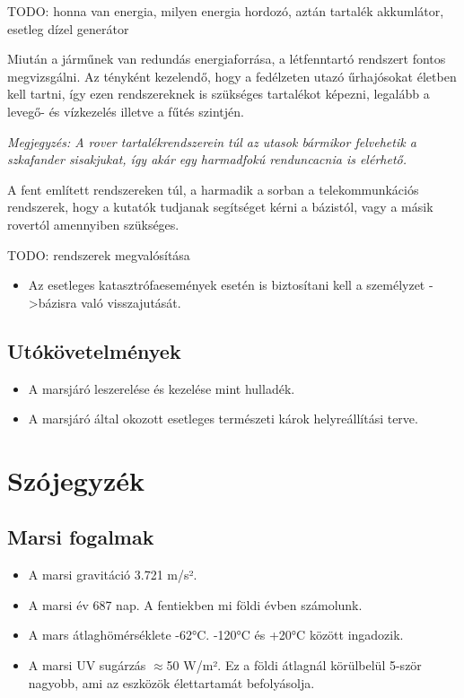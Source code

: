 \documentclass[12pt]{report}
\begin{document}
TODO: honna van energia, milyen energia hordozó, aztán tartalék akkumlátor, esetleg dízel generátor

Miután a járműnek van redundás energiaforrása, a létfenntartó rendszert fontos megvizsgálni. Az tényként kezelendő, hogy a fedélzeten utazó űrhajósokat életben kell tartni, így ezen rendszereknek is szükséges tartalékot képezni, legalább a levegő- és vízkezelés illetve a fűtés szintjén. 

\textit{Megjegyzés: A rover tartalékrendszerein túl az utasok bármikor felvehetik a szkafander sisakjukat, így akár egy harmadfokú renduncacnia is elérhető.}

A fent említett rendszereken túl, a harmadik a sorban a telekommunkációs rendszerek, hogy a kutatók tudjanak segítséget kérni a bázistól, vagy a másik rovertól amennyiben szükséges.

TODO: rendszerek megvalósítása







\begin{itemize}
  \item Az esetleges katasztrófaesemények esetén is biztosítani kell a személyzet ->bázisra való visszajutását.
\end{itemize}
\section{Utókövetelmények}
\begin{itemize}
  \item A marsjáró leszerelése és kezelése mint hulladék.
  \item A marsjáró által okozott esetleges természeti károk helyreállítási terve.
\end{itemize}

\chapter{Szójegyzék}
\section{Marsi fogalmak}
\begin{itemize}
  \item A marsi gravitáció 3.721 m/s².
  \item A marsi év 687 nap. A fentiekben mi földi évben számolunk.
  \item A mars átlaghömérséklete -62°C. -120°C és +20°C között ingadozik.
  \item A marsi UV sugárzás $\approx$50 W/m². Ez a földi átlagnál körülbelül 5-ször nagyobb, ami az eszközök élettartamát befolyásolja.
\end{itemize}
\end{document}
